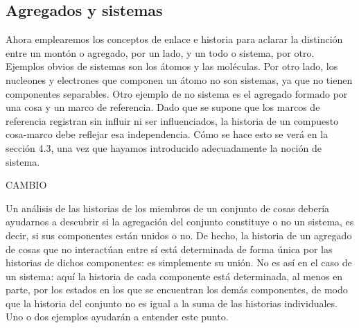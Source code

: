 \begin{justifying}
    \subsection{Agregados y sistemas}
    Ahora emplearemos los conceptos de enlace e historia para aclarar la
    distinción entre un montón o agregado, por un lado, y un todo
    o sistema, por otro. Ejemplos obvios de sistemas son los átomos y las
    moléculas. Por otro lado, los nucleones y electrones que componen un
    átomo no son sistemas, ya que no tienen componentes separables.
    Otro ejemplo de no sistema es el agregado formado por una cosa y
    un marco de referencia. Dado que se supone que los marcos de referencia registran
    sin influir ni ser influenciados, la historia de un compuesto cosa-marco debe reflejar esa independencia. Cómo se hace esto se
    verá en la sección 4.3, una vez que hayamos introducido adecuadamente la noción de
    sistema.

    \begin{center}
        CAMBIO
    \end{center}

    Un análisis de las historias de los miembros de un conjunto de cosas debería
    ayudarnos a descubrir si la agregación del conjunto constituye o no un
    sistema, es decir, si sus componentes están unidos o no. De hecho, la
    historia de un agregado de cosas que no interactúan entre sí está determinada de forma única
    por las historias de dichos componentes: es simplemente su unión. No es así en el
    caso de un sistema: aquí la historia de cada componente está determinada, al
    menos en parte, por los estados en los que se encuentran los demás componentes, de modo que la historia del
    conjunto no es igual a la suma de las historias individuales. Uno
    o dos ejemplos ayudarán a entender este punto.


\end{justifying}
